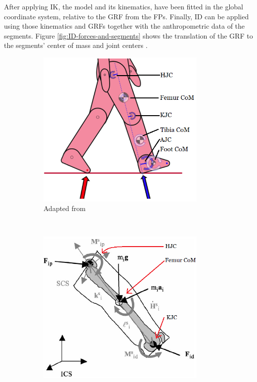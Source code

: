 \documentclass[../main.tex]{subfiles}
\begin{document}
After applying \ac{IK}, the model and its kinematics, have been fitted in the global coordinate system, relative to the \ac{GRF} from the \acp{FP}.
Finally, \ac{ID} can be applied using those kinematics and \acp{GRF} together with the anthropometric data of the segments.
Figure \ref{fig:ID-forces-and-segments} shows the translation of the \ac{GRF} to the segments' center of mass and joint centers \cite{cgm-ID, Dumas2004}.
\begin{figure}[!htb]
    \centering
    \begin{subfigure}[t]{0.45\textwidth}
        \centering
        \includegraphics[width=0.9\textwidth]{img/ID_CGM2_labeled.png}
        \caption{Adapted from \cite{cgm-ID}}
        \label{fig:cgm-ID-force-prop}
    \end{subfigure}
    ~
    \begin{subfigure}[t]{0.45\textwidth}
        \centering
        \includegraphics[width=0.9\textwidth]{img/Conventional_ID_labeled.png}

\end{subfigure}
\end{figure}
\end{document}
